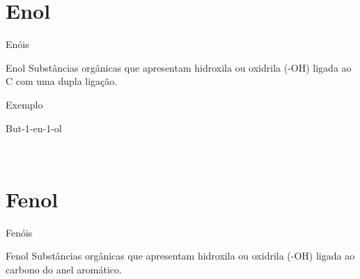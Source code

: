 \documentclass[presentation,professionalfonts,aspectratio=169]{beamer}
\newcommand{\af}{\hspace{2cm}}
\begin{document}
\section{Enol}
\label{sec:org38ce8eb}
\begin{frame}[label={sec:orgfb11b23}]{Enóis}
\begin{mybox}{Enol}
Substâncias  orgânicas  que  apresentam  hidroxila  ou oxidrila (-OH) ligada ao C com uma dupla ligação.


  \begin{center}
\chemmove{
	\node[inner sep=2pt,fill=red,fill opacity=0.2,fit=(OH1) (OH2)]{};
    }
    \end{center}

\end{mybox}
   \begin{myex}{Exemplo}
 \begin{center}  
{But-1-en-1-ol}
\end{center}\
%
\end{myex}
\end{frame}



\section{Fenol}
\label{sec:orgcde1ebc}
\begin{frame}[label={sec:org1103fa0}]{Fenóis}
\begin{mybox}{Fenol}
Substâncias  orgânicas  que  apresentam  hidroxila  ou oxidrila (-OH) ligada ao carbono do anel aromático.



\end{mybox}
\end{frame}
\end{document}
